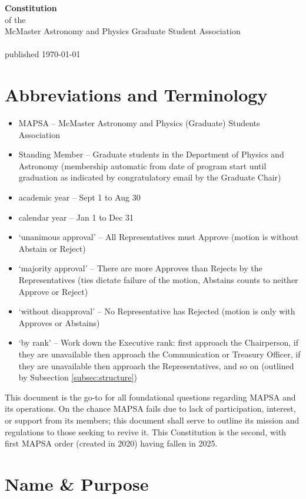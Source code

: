 \documentclass[8pt]{article}
\begin{document}
	
	\begin{center}
		\textbf{\Huge{Constitution}}\\\normalsize{of the}\\McMaster Astronomy and Physics Graduate Student Association\\~\\
		published \today
	\end{center}
	\tableofcontents	
	\pagebreak
	\section*{Abbreviations and Terminology}
	\begin{itemize}
		\item MAPSA -- McMaster Astronomy and Physics (Graduate) Students Association
		\item Standing Member -- Graduate students in the Department of Physics and Astronomy (membership automatic from date of program start until graduation as indicated by congratulatory email by the Graduate Chair) 
		\item academic year -- Sept 1 to Aug 30
		\item calendar year -- Jan 1 to Dec 31
		\item `unanimous approval' -- All Representatives must Approve (motion is without Abstain or Reject)
		\item `majority approval' -- There are more Approves than Rejects by the Representatives (ties dictate failure of the motion, Abstains counts to neither Approve or Reject)
		\item `without disapproval' -- No Representative has Rejected (motion is only with Approves or Abstains)
		\item `by rank' -- Work down the Executive rank: first approach the Chairperson, if they are unavailable then approach the Communication or Treasury Officer, if they are unavailable then approach the Representatives, and so on (outlined by Subsection \ref{subsec:structure})
	\end{itemize}
	\pagebreak
	This document is the go-to for all foundational questions regarding MAPSA and its operations. On the chance MAPSA fails due to lack of participation, interest, or support from its members; this document shall serve to outline its mission and regulations to those seeking to revive it. This Constitution is the second, with first MAPSA order (created in 2020) having fallen in 2025.
	\section{Name \& Purpose}
\end{document}
